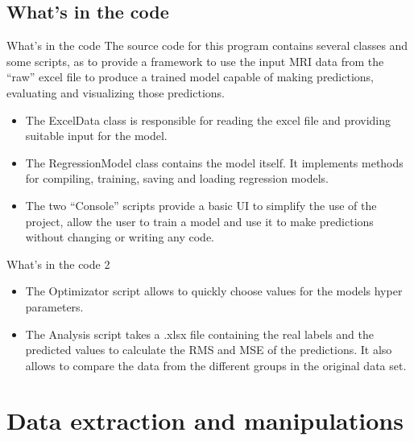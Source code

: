 \documentclass{beamer}
\begin{document}
\subsection{What's in the code}
\begin{frame}{What's in the code}
The source code for this program contains several classes and some scripts, as to provide a framework to use the input MRI data from the ``raw'' excel file to produce a trained model capable of making predictions, evaluating and visualizing those predictions.
    \begin{itemize}
		\item The ExcelData class is responsible for reading the excel file and providing suitable input for the model.  
		\item The RegressionModel class contains the model itself. It implements methods for compiling, training, saving and loading regression models.
        \item The two ``Console'' scripts provide a basic UI to simplify the use of the project, allow the user to train a model and use it to make predictions without changing or writing any code.
    \end{itemize}
\end{frame}

\begin{frame}{What's in the code 2}
    \begin{itemize}
        \item The Optimizator script allows to quickly choose values for the models hyper parameters.
		\item The Analysis script takes a .xlsx file containing the real labels and the predicted values to calculate the RMS and MSE of the predictions. It also allows to compare the data from the different groups in the original data set.
    \end{itemize}
\end{frame}

\section{Data extraction and manipulations}
\end{document}
